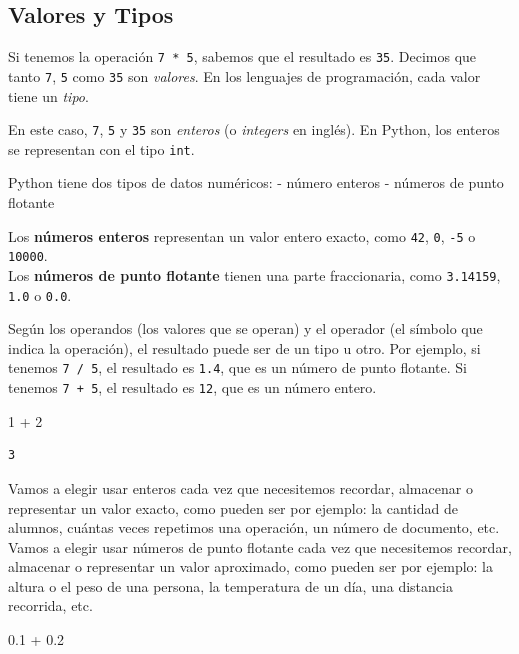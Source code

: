 \documentclass[
  letterpaper,
  DIV=11,
  numbers=noendperiod]{scrreprt}
\newenvironment{Shaded}{\begin{snugshade}}{\end{snugshade}}
\newcommand{\DecValTok}[1]{\textcolor[rgb]{0.68,0.00,0.00}{#1}}
\newcommand{\FloatTok}[1]{\textcolor[rgb]{0.68,0.00,0.00}{#1}}
\newcommand{\OperatorTok}[1]{\textcolor[rgb]{0.37,0.37,0.37}{#1}}
\begin{document}
\subsection{Valores y Tipos}\label{valores-y-tipos}

Si tenemos la operación \texttt{7\ *\ 5}, sabemos que el resultado es
\texttt{35}. Decimos que tanto \texttt{7}, \texttt{5} como \texttt{35}
son \emph{valores}. En los lenguajes de programación, cada valor tiene
un \emph{tipo}.

En este caso, \texttt{7}, \texttt{5} y \texttt{35} son \emph{enteros} (o
\emph{integers} en inglés). En Python, los enteros se representan con el
tipo \texttt{int}.

Python tiene dos tipos de datos numéricos: - número enteros - números de
punto flotante

Los \textbf{números enteros} representan un valor entero exacto, como
\texttt{42}, \texttt{0}, \texttt{-5} o \texttt{10000}.\\
Los \textbf{números de punto flotante} tienen una parte fraccionaria,
como \texttt{3.14159}, \texttt{1.0} o \texttt{0.0}.

Según los operandos (los valores que se operan) y el operador (el
símbolo que indica la operación), el resultado puede ser de un tipo u
otro. Por ejemplo, si tenemos \texttt{7\ /\ 5}, el resultado es
\texttt{1.4}, que es un número de punto flotante. Si tenemos
\texttt{7\ +\ 5}, el resultado es \texttt{12}, que es un número entero.

\begin{Shaded}
\begin{Highlighting}[]
\DecValTok{1} \OperatorTok{+} \DecValTok{2}
\end{Highlighting}
\end{Shaded}

\begin{verbatim}
3
\end{verbatim}

Vamos a elegir usar enteros cada vez que necesitemos recordar, almacenar
o representar un valor exacto, como pueden ser por ejemplo: la cantidad
de alumnos, cuántas veces repetimos una operación, un número de
documento, etc.\\
Vamos a elegir usar números de punto flotante cada vez que necesitemos
recordar, almacenar o representar un valor aproximado, como pueden ser
por ejemplo: la altura o el peso de una persona, la temperatura de un
día, una distancia recorrida, etc.

\begin{Shaded}
\begin{Highlighting}[]
\FloatTok{0.1} \OperatorTok{+} \FloatTok{0.2}
\end{Highlighting}
\end{Shaded}
\end{document}
